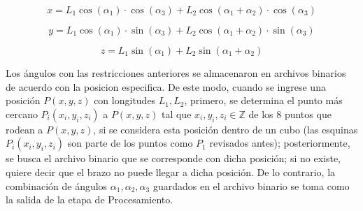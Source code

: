 


\begin{equation}
	x = L_1 \cos(\alpha_1) \cdot \cos(\alpha_3) + L_2 \cos(\alpha_1 + \alpha_2) \cdot \cos(\alpha_3)
\end{equation}

\begin{equation}
	y = L_1 \cos(\alpha_1) \cdot \sin(\alpha_3) + L_2 \cos(\alpha_1 + \alpha_2) \cdot \sin(\alpha_3)
\end{equation}

\begin{equation}
	z = L_1 \sin(\alpha_1) + L_2 \sin(\alpha_1 + \alpha_2)
\end{equation}

Los ángulos con las restricciones anteriores se almacenaron en archivos binarios de acuerdo con la posicion especifica. De este modo, cuando se ingrese una posición $P(x,y,z)$ con longitudes $L_1, L_2$, primero, se determina el punto más cercano $P_i(x_i,y_i,z_i)$ a $P(x,y,z)$ tal que $x_i,y_i,z_i \in \mathbb{Z}$ de los 8 puntos que rodean a $P(x,y,z)$, si se considera esta posición dentro de un cubo (las esquinas $P_i(x_i,y_i,z_i)$ son parte de los puntos como $P_1$ revisados antes); posteriormente, se busca el archivo binario que se corresponde con dicha posición; si no existe, quiere decir que el brazo no puede llegar a dicha posición. De lo contrario, la combinación de ángulos $\alpha_1, \alpha_2, \alpha_3$ guardados en el archivo binario se toma como la salida de la etapa de Procesamiento.